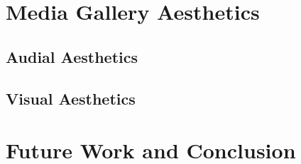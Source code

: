 \documentclass{article}
\begin{document}
\section{Media Gallery Aesthetics}
\subsection{Audial Aesthetics}

\subsection{Visual Aesthetics}

\section{Future Work and Conclusion}



\end{document}
